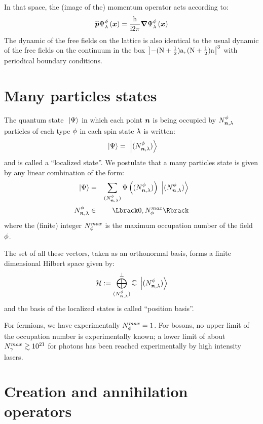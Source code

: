 In that space, the (image of the) momentum operator acts according to:
\begin{equation*}
\Pop \wf \Psi \pt \sp {\sv x} = \frac{\h}{\i 2 \pi} \sv \nabla \wf \Psi \pt \sp {\sv x}
\end{equation*}
The dynamic of the free fields on the lattice is also identical to the usual dynamic of the free fields on the continuum in the box $\left]-(\N+\frac 1 2)\a,(\N+\frac 1 2)\a\right[^3$ with periodical boundary conditions.

\section{Many particles states}
\label{Many particles states}

The quantum state $\ket{\Psi}$ in which each point $\n$ is being occupied by $\bX N \pt \n \sp$ particles of each type $\pt$ in each spin state $\sp$ is written:
\begin{equation*}
\ket{\Psi} = \ketFX N \pt \n \sp
\end{equation*}
and is called a ``localized state''. We postulate that a many particles state is given by any linear combination of the form:
\begin{eqnarray*}
\ket{\Psi} & = & \sum_{\bFX N \pt \n \sp} \Psi \left(\bFX N \pt \n \sp \right) \ketFX N \pt \n \sp \\
\bX N \pt \n \sp & \in & \IntRange{0}{\M \pt}
\end{eqnarray*}
where the (finite) integer $\M \pt$ is the maximum occupation number of the field $\pt$.

The set of all these vectors, taken as an orthonormal basis, forms a finite dimensional Hilbert space given by:
\begin{equation*}
\H \eqdef \bigoplus^\perp_{\bFX N \pt \n \sp} \IC \ketFX N \pt \n \sp
\end{equation*}
and the basis of the localized states is called ``position basis''.

 For fermions, we have experimentally $\M \pt = 1$. For bosons, no upper limit of the occupation number is experimentally known; a lower limit of about $\M \photon \gtrsim 10^{21}$ for photons has been reached experimentally by high intensity lasers.

\section{Creation and annihilation operators}

